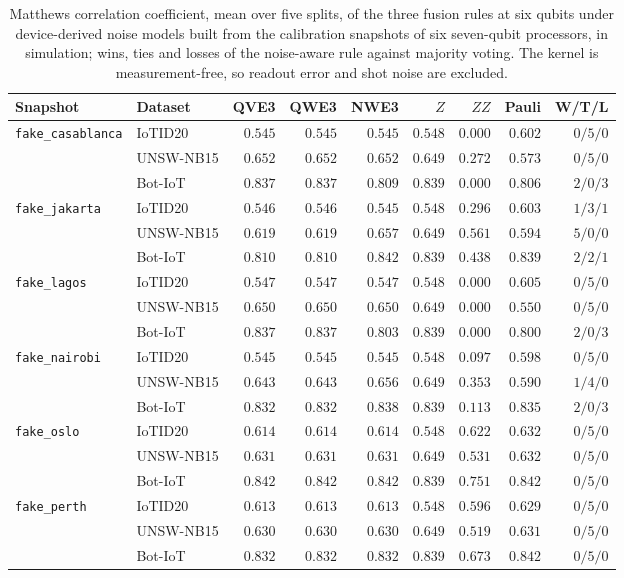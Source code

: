 \begin{table}[t]
\centering
\caption{Matthews correlation coefficient, mean over five splits, of the three fusion rules at
six qubits under device-derived noise models built from the calibration snapshots of
six seven-qubit processors, in simulation; wins, ties and losses of the noise-aware rule against majority
voting. The kernel is measurement-free, so readout error and shot noise are excluded.}
\label{tab:s2device}
\footnotesize
\setlength{\tabcolsep}{3pt}
\begin{tabular}{@{}llrrrrrrr@{}}
\toprule
Snapshot & Dataset & QVE3 & QWE3 & NWE3 & $Z$ & $ZZ$ & Pauli & W/T/L \\
\midrule
\multirow{3}{*}{\texttt{fake\_casablanca}}
 & IoTID20 & $0.545$ & $0.545$ & $0.545$ & $0.548$ & $0.000$ & $0.602$ & $0/5/0$ \\
 & UNSW-NB15 & $0.652$ & $0.652$ & $0.652$ & $0.649$ & $0.272$ & $0.573$ & $0/5/0$ \\
 & Bot-IoT & $0.837$ & $0.837$ & $0.809$ & $0.839$ & $0.000$ & $0.806$ & $2/0/3$ \\
\midrule
\multirow{3}{*}{\texttt{fake\_jakarta}}
 & IoTID20 & $0.546$ & $0.546$ & $0.545$ & $0.548$ & $0.296$ & $0.603$ & $1/3/1$ \\
 & UNSW-NB15 & $0.619$ & $0.619$ & $0.657$ & $0.649$ & $0.561$ & $0.594$ & $5/0/0$ \\
 & Bot-IoT & $0.810$ & $0.810$ & $0.842$ & $0.839$ & $0.438$ & $0.839$ & $2/2/1$ \\
\midrule
\multirow{3}{*}{\texttt{fake\_lagos}}
 & IoTID20 & $0.547$ & $0.547$ & $0.547$ & $0.548$ & $0.000$ & $0.605$ & $0/5/0$ \\
 & UNSW-NB15 & $0.650$ & $0.650$ & $0.650$ & $0.649$ & $0.000$ & $0.550$ & $0/5/0$ \\
 & Bot-IoT & $0.837$ & $0.837$ & $0.803$ & $0.839$ & $0.000$ & $0.800$ & $2/0/3$ \\
\midrule
\multirow{3}{*}{\texttt{fake\_nairobi}}
 & IoTID20 & $0.545$ & $0.545$ & $0.545$ & $0.548$ & $0.097$ & $0.598$ & $0/5/0$ \\
 & UNSW-NB15 & $0.643$ & $0.643$ & $0.656$ & $0.649$ & $0.353$ & $0.590$ & $1/4/0$ \\
 & Bot-IoT & $0.832$ & $0.832$ & $0.838$ & $0.839$ & $0.113$ & $0.835$ & $2/0/3$ \\
\midrule
\multirow{3}{*}{\texttt{fake\_oslo}}
 & IoTID20 & $0.614$ & $0.614$ & $0.614$ & $0.548$ & $0.622$ & $0.632$ & $0/5/0$ \\
 & UNSW-NB15 & $0.631$ & $0.631$ & $0.631$ & $0.649$ & $0.531$ & $0.632$ & $0/5/0$ \\
 & Bot-IoT & $0.842$ & $0.842$ & $0.842$ & $0.839$ & $0.751$ & $0.842$ & $0/5/0$ \\
\midrule
\multirow{3}{*}{\texttt{fake\_perth}}
 & IoTID20 & $0.613$ & $0.613$ & $0.613$ & $0.548$ & $0.596$ & $0.629$ & $0/5/0$ \\
 & UNSW-NB15 & $0.630$ & $0.630$ & $0.630$ & $0.649$ & $0.519$ & $0.631$ & $0/5/0$ \\
 & Bot-IoT & $0.832$ & $0.832$ & $0.832$ & $0.839$ & $0.673$ & $0.842$ & $0/5/0$ \\
\bottomrule
\end{tabular}
\end{table}
